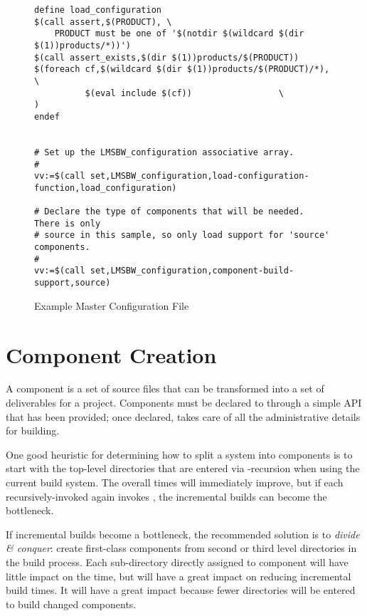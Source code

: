 \begin{landscape}
\begin{figure}
\hrulefill
\begin{verbatim}
define load_configuration
$(call assert,$(PRODUCT), \
    PRODUCT must be one of '$(notdir $(wildcard $(dir $(1))products/*))')
$(call assert_exists,$(dir $(1))products/$(PRODUCT))
$(foreach cf,$(wildcard $(dir $(1))products/$(PRODUCT)/*),	\
          $(eval include $(cf))					\
)
endef


# Set up the LMSBW_configuration associative array.
#
vv:=$(call set,LMSBW_configuration,load-configuration-function,load_configuration)

# Declare the type of components that will be needed.  There is only
# source in this sample, so only load support for 'source' components.
#
vv:=$(call set,LMSBW_configuration,component-build-support,source)
\end{verbatim}
\hrulefill
\caption{Example Master Configuration File}\label{wrap:sample-master-config}
\end{figure}
\end{landscape}

\section{Component Creation}\label{wrap:component-creation}

A component is a set of source files that can be transformed into a
set of deliverables for a project.  Components must be declared to
\lmsbw through a simple API that has been provided; once declared,
\lmsbw takes care of all the administrative details for building.

One good heuristic for determining how to split a system into
components is to start with the top-level directories that are entered
via \make-recursion when using the current build system.  The overall
\nullbuild times will immediately improve, but if each
recursively-invoked \makefile again invokes \make, the incremental
builds can become the bottleneck.

If incremental builds become a bottleneck, the recommended solution is
to \emph{divide \& conquer}: create first-class components from second
or third level directories in the build process.  Each sub-directory
directly assigned to component will have little impact on the
\nullbuild time, but will have a great impact on reducing incremental
build times.  It will have a great impact because fewer directories
will be entered to build changed components.

